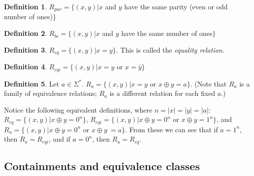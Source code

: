 \documentclass{amsart}
\theoremstyle{definition} \newtheorem{definition}[definition]{Definition}
\newcommand{\sigmastar}{\Sigma^{*}} %
\newcommand{\defn}[1]{\emph{#1}} %
\begin{document}
\begin{definition}
  $R_{par}=\{(x, y)|x$ and $y$ have the same parity (even or odd number of
  ones)$\}$
\end{definition}
\begin{definition}
  $R_{bc}=\{(x, y)|x$ and $y$ have the same number of ones$\}$
\end{definition}
\begin{definition}
  $R_{eq}=\{(x, y)|x=y\}$. This is called the \defn{equality relation}.
\end{definition}
\begin{definition}
  $R_{eqi}=\{(x, y)|x=y$ or $x=\bar{y}\}$
\end{definition}
\begin{definition}
  Let $a\in\sigmastar$. $R_{a}=\{(x,y)|x=y$ or $x\oplus y=a\}$. (Note that
  $R_{a}$ is a family of equivalence relations; $R_{a}$ is a different relation
  for each fixed $a$.)
\end{definition}

Notice the following equivalent definitions, where $n=|x|=|y|=|a|$:
$R_{eq}=\{(x, y)|x \oplus y = 0^n\}$, $R_{eqi}=\{(x, y)|x \oplus y = 0^n$ or
$x\oplus y = 1^n\}$, and $R_a=\{(x,y)|x \oplus y = 0^n$ or $x \oplus y\ =
a\}$. From these we can see that if $a=1^n$, then $R_a=R_{eqi}$, and if
$a=0^n$, then $R_a=R_{eq}$.

\subsection{Containments and equivalence classes}
\end{document}
